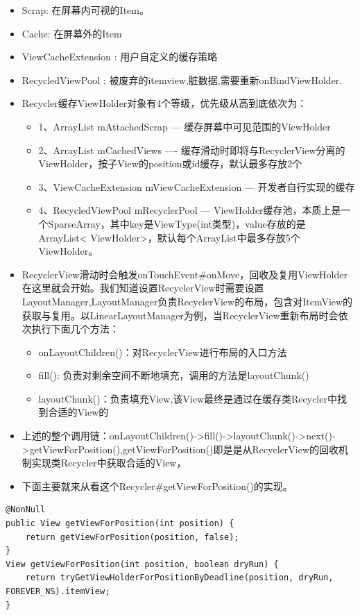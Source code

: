 \documentclass[9pt, b5paper]{article}
\begin{document}
\begin{itemize}
\item Scrap: 在屏幕内可视的Item。
\item Cache: 在屏幕外的Item
\item ViewCacheExtension : 用户自定义的缓存策略
\item RecycledViewPool : 被废弃的itemview,脏数据,需要重新onBindViewHolder.
\item Recycler缓存ViewHolder对象有4个等级，优先级从高到底依次为：
\begin{itemize}
\item 1、ArrayList mAttachedScrap --- 缓存屏幕中可见范围的ViewHolder
\item 2、ArrayList mCachedViews ---- 缓存滑动时即将与RecyclerView分离的ViewHolder，按子View的position或id缓存，默认最多存放2个
\item 3、ViewCacheExtension mViewCacheExtension --- 开发者自行实现的缓存
\item 4、RecycledViewPool mRecyclerPool --- ViewHolder缓存池，本质上是一个SparseArray，其中key是ViewType(int类型)，value存放的是 ArrayList< ViewHolder>，默认每个ArrayList中最多存放5个ViewHolder。
\end{itemize}

\item RecyclerView滑动时会触发onTouchEvent\#onMove，回收及复用ViewHolder在这里就会开始。我们知道设置RecyclerView时需要设置LayoutManager,LayoutManager负责RecyclerView的布局，包含对ItemView的获取与复用。以LinearLayoutManager为例，当RecyclerView重新布局时会依次执行下面几个方法：
\begin{itemize}
\item onLayoutChildren()：对RecyclerView进行布局的入口方法
\item fill(): 负责对剩余空间不断地填充，调用的方法是layoutChunk()
\item layoutChunk()：负责填充View,该View最终是通过在缓存类Recycler中找到合适的View的
\end{itemize}
\item 上述的整个调用链：onLayoutChildren()->fill()->layoutChunk()->next()->getViewForPosition(),getViewForPosition()即是是从RecyclerView的回收机制实现类Recycler中获取合适的View，
\item 下面主要就来从看这个Recycler\#getViewForPosition()的实现。
\end{itemize}
\begin{verbatim}
@NonNull 
public View getViewForPosition(int position) { 
    return getViewForPosition(position, false); 
} 
View getViewForPosition(int position, boolean dryRun) { 
    return tryGetViewHolderForPositionByDeadline(position, dryRun, FOREVER_NS).itemView; 
}
\end{verbatim}
\end{document}
